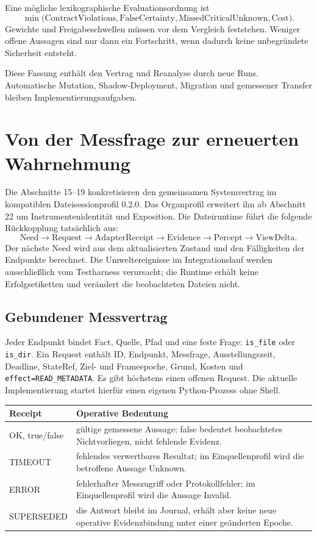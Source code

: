 \documentclass[11pt,a4paper]{article}
\newcommand{\nextsection}[2]{\clearpage{\color{accent}\small\textsf{#1}}\section{#2}}
\begin{document}
Eine mögliche lexikographische Evaluationsordnung ist
\[
\min\big(\mathrm{ContractViolations},\mathrm{FalseCertainty},
\mathrm{MissedCriticalUnknown},\mathrm{Cost}\big).
\]
Gewichte und Freigabeschwellen müssen vor dem Vergleich feststehen.
Weniger offene Aussagen sind nur dann ein Fortschritt, wenn
dadurch keine unbegründete Sicherheit entsteht.

Diese Fassung enthält den Vertrag und Reanalyse durch neue Runs.
Automatische Mutation, Shadow-Deployment, Migration und
gemessener Transfer bleiben Implementierungsaufgaben.


\nextsection{15 / GESCHLOSSENER ZYKLUS}{Von der Messfrage zur erneuerten Wahrnehmung}
Die Abschnitte 15--19 konkretisieren den gemeinsamen Systemvertrag
im kompatiblen Dateisessionprofil 0.2.0. Das Organprofil erweitert
ihn ab Abschnitt 22 um Instrumentenidentität und Exposition.
Die Dateiruntime führt die folgende Rückkopplung tatsächlich aus:
\[
\mathrm{Need}\to\mathrm{Request}\to\mathrm{AdapterReceipt}
\to\mathrm{Evidence}\to\mathrm{Percept}\to\mathrm{ViewDelta}.
\]
Der nächste Need wird aus dem aktualisierten Zustand und den
Fälligkeiten der Endpunkte berechnet. Die Umweltereignisse im
Integrationslauf werden ausschließlich vom Testharness verursacht;
die Runtime erhält keine Erfolgsetiketten und verändert die
beobachteten Dateien nicht.

\subsection{Gebundener Messvertrag}
Jeder Endpunkt bindet Fact, Quelle, Pfad und eine feste Frage:
\texttt{is\_file} oder \texttt{is\_dir}. Ein Request enthält ID,
Endpunkt, Messfrage, Ausstellungszeit, Deadline, StateRef,
Ziel- und Frameepoche, Grund, Kosten und
\texttt{effect=READ\_METADATA}. Es gibt höchstens einen
offenen Request. Die aktuelle Implementierung startet hierfür
einen eigenen Python-Prozess ohne Shell.

\begin{tabularx}{\linewidth}{@{}lY@{}}
\toprule
Receipt & Operative Bedeutung\\\midrule
OK, true/false & gültige gemessene Aussage; false bedeutet
beobachtetes Nichtvorliegen, nicht fehlende Evidenz.\\
TIMEOUT & fehlendes verwertbares Resultat; im Einquellenprofil
wird die betroffene Aussage Unknown.\\
ERROR & fehlerhafter Messzugriff oder Protokollfehler;
im Einquellenprofil wird die Aussage Invalid.\\
SUPERSEDED & die Antwort bleibt im Journal, erhält aber keine
neue operative Evidenzbindung unter einer geänderten Epoche.\\
\bottomrule
\end{tabularx}
\end{document}

